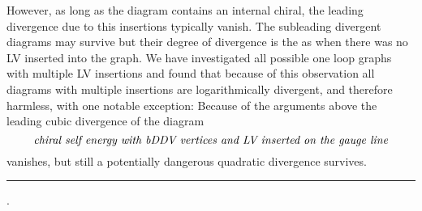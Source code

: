 \documentclass[12pt]{revtex4}
\begin{document}
However, as long as the diagram contains an internal chiral, the
leading divergence due to this insertions typically vanish. The
subleading divergent diagrams may survive but their degree of
divergence is the as when there was no LV inserted into the graph. 
We have investigated all possible one loop graphs with multiple LV
insertions and found that because of this observation all diagrams
with multiple insertions are logarithmically divergent, and therefore
harmless, with one notable exception: Because of the arguments above
the leading cubic divergence of the diagram 
\begin{equation}
\mbox{\em chiral self energy with bDDV vertices and LV inserted on the
gauge line}
\label{QuadraticRunning}
\end{equation} 
vanishes, but still a potentially dangerous quadratic divergence survives. 
\\\hrule{.}\\ 
\end{document}
